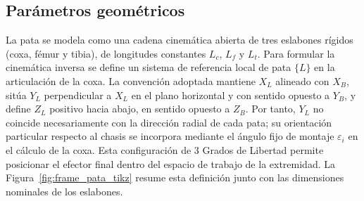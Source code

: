 \vspace{-1\baselineskip}
\subsection{Parámetros geométricos}

La pata se modela como una cadena cinemática abierta de tres eslabones rígidos (coxa, fémur y tibia), de longitudes constantes $L_c$, $L_f$ y $L_t$. Para formular la cinemática inversa se define un sistema de referencia local de pata $\{L\}$ en la articulación de la coxa. La convención adoptada mantiene $X_L$ alineado con $X_B$, sitúa $Y_L$ perpendicular a $X_L$ en el plano horizontal y con sentido opuesto a $Y_B$, y define $Z_L$ positivo hacia abajo, en sentido opuesto a $Z_B$. Por tanto, $Y_L$ no coincide necesariamente con la dirección radial de cada pata; su orientación particular respecto al chasis se incorpora mediante el ángulo fijo de montaje $\varepsilon_i$ en el cálculo de la coxa. Esta configuración de 3 Grados de Libertad permite posicionar el efector final dentro del espacio de trabajo de la extremidad. La Figura~\ref{fig:frame_pata_tikz} resume esta definición junto con las dimensiones nominales de los eslabones.

